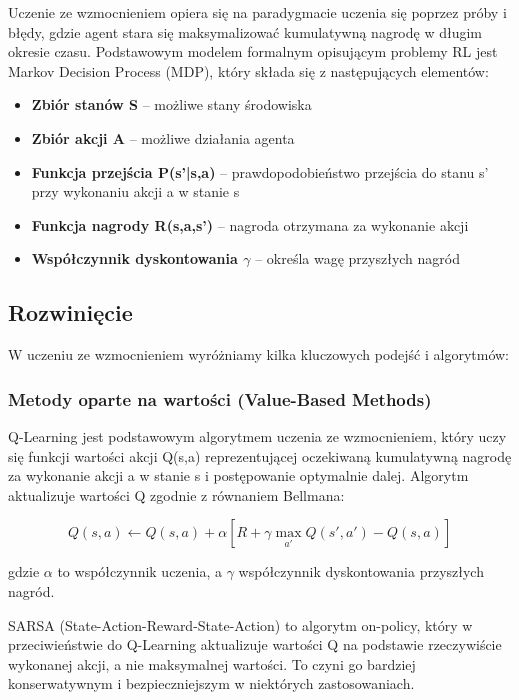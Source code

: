 \documentclass[12pt,a4paper]{article}
\begin{document}
Uczenie ze wzmocnieniem opiera się na paradygmacie uczenia się poprzez próby i błędy, gdzie agent stara się maksymalizować kumulatywną nagrodę w długim okresie czasu. Podstawowym modelem formalnym opisującym problemy RL jest Markov Decision Process (MDP), który składa się z następujących elementów:

\begin{itemize}
\item \textbf{Zbiór stanów S} -- możliwe stany środowiska
\item \textbf{Zbiór akcji A} -- możliwe działania agenta
\item \textbf{Funkcja przejścia P(s'|s,a)} -- prawdopodobieństwo przejścia do stanu s' przy wykonaniu akcji a w stanie s
\item \textbf{Funkcja nagrody R(s,a,s')} -- nagroda otrzymana za wykonanie akcji
\item \textbf{Współczynnik dyskontowania $\gamma$} -- określa wagę przyszłych nagród
\end{itemize}

\subsection{Rozwinięcie}

W uczeniu ze wzmocnieniem wyróżniamy kilka kluczowych podejść i algorytmów:

\subsubsection{Metody oparte na wartości (Value-Based Methods)}

Q-Learning jest podstawowym algorytmem uczenia ze wzmocnieniem, który uczy się funkcji wartości akcji Q(s,a) reprezentującej oczekiwaną kumulatywną nagrodę za wykonanie akcji a w stanie s i postępowanie optymalnie dalej. Algorytm aktualizuje wartości Q zgodnie z równaniem Bellmana:

$$Q(s,a) \leftarrow Q(s,a) + \alpha \left[R + \gamma \max_{a'} Q(s',a') - Q(s,a)\right]$$

gdzie $\alpha$ to współczynnik uczenia, a $\gamma$ współczynnik dyskontowania przyszłych nagród.

SARSA (State-Action-Reward-State-Action) to algorytm on-policy, który w przeciwieństwie do Q-Learning aktualizuje wartości Q na podstawie rzeczywiście wykonanej akcji, a nie maksymalnej wartości. To czyni go bardziej konserwatywnym i bezpieczniejszym w niektórych zastosowaniach.
\end{document}
